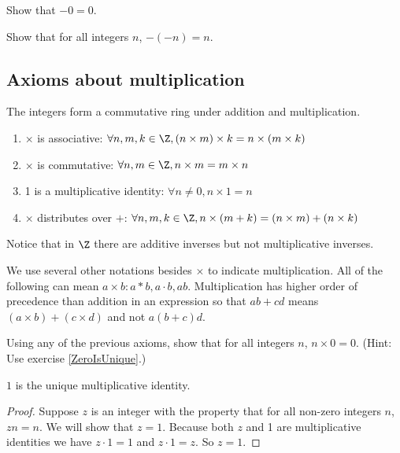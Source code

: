 \documentclass[oneside,12pt]{amsart}
\begin{document}
\begin{homework}
Show that $-0 = 0$.
\end{homework}

\begin{homework}
Show that for all integers $n$, $-(-n) = n$.
\end{homework}

\subsection{Axioms about multiplication}
The integers form a commutative ring under addition and multiplication.

\begin{enumerate}
\item $\times$ is associative: $\forall n,m,k\in\Z, (n\times m )\times k = n \times (m \times k)$
\item $\times$ is commutative: $\forall n,m\in\Z, n\times m = m\times n$
\item 1 is a multiplicative identity: $\forall n\not= 0, n\times 1 = n$
\item $\times$ distributes over $+$: $\forall n,m,k\in\Z, n\times(m+k) = (n\times m) + (n\times k)$
\end{enumerate}

\begin{remark}
Notice that in $\Z$ there are additive inverses but not multiplicative inverses.
\end{remark}

We use several other notations besides $\times$ to indicate multiplication.
All of the following can mean $a\times b: a*b, a\cdot b, ab$.
Multiplication has higher order of precedence than addition in an expression so
that $ab+cd$ means $(a\times b) + (c\times d)$ and not $a(b+c)d$.

\begin{homework}
Using any of the previous axioms, show that for all integers $n$, $n\times 0 = 0$.
(Hint: Use exercise \ref{ZeroIsUnique}.)
\end{homework}

\begin{lemma}
\label{OneIsUnique}
$1$ is the unique multiplicative identity.
\end{lemma}
\begin{proof}
Suppose $z$ is an integer with the property that for all non-zero integers $n$,
$zn = n$. We will show that $z=1$. Because both $z$ and 1 are multiplicative
identities we have $z\cdot 1 = 1$ and $z\cdot 1 = z$. So $z=1$.
\end{proof}
\end{document}
